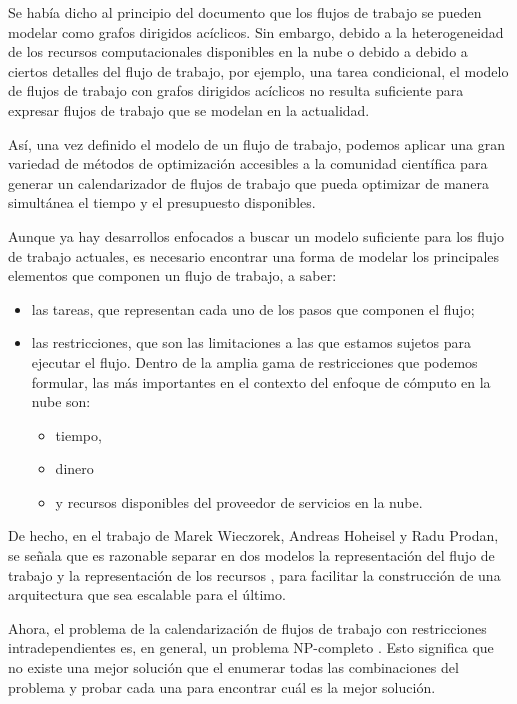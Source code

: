 \documentclass[letterpaper]{report}
\begin{document}
Se había dicho al principio del documento que los flujos de trabajo se pueden modelar como grafos dirigidos acíclicos. Sin embargo, debido a la heterogeneidad de los recursos computacionales disponibles en la nube o debido a debido a ciertos detalles del flujo de trabajo, por ejemplo, una tarea condicional, el modelo de flujos de trabajo con grafos dirigidos acíclicos no resulta suficiente para expresar flujos de trabajo que se modelan en la actualidad. 

Así, una vez definido el modelo de un flujo de trabajo, podemos aplicar una gran variedad de métodos de optimización accesibles a la comunidad científica para generar un calendarizador de flujos de trabajo que pueda optimizar de manera simultánea el tiempo y el presupuesto disponibles.

Aunque ya hay desarrollos enfocados a buscar un modelo suficiente para los flujo de trabajo actuales, es necesario encontrar una forma de modelar los principales elementos que componen un flujo de trabajo, a saber: 
\begin{itemize}
\item las tareas, que representan cada uno de los pasos que componen el flujo;
\item las restricciones, que son las limitaciones a las que estamos sujetos para ejecutar el flujo. Dentro de la amplia gama de restricciones que podemos formular, las más importantes en el contexto del enfoque de cómputo en la nube son:
  \begin{itemize}
  \item tiempo,
  \item dinero 
  \item y recursos disponibles del proveedor de servicios en la nube.
  \end{itemize}
\end{itemize}
De hecho, en el trabajo de Marek Wieczorek, Andreas Hoheisel y Radu Prodan, se señala que es razonable separar en dos modelos la representación del flujo de trabajo y la representación de los recursos \cite{wieczorek2009towards}, para facilitar la construcción de una arquitectura que sea escalable para el último.

Ahora, el problema de la calendarización de flujos de trabajo con restricciones intradependientes es, en general, un problema NP-completo \cite{wieczorek2009towards}. Esto significa que no existe una mejor solución que el enumerar todas las combinaciones del problema y probar cada una para encontrar cuál es la mejor solución.
\end{document}
